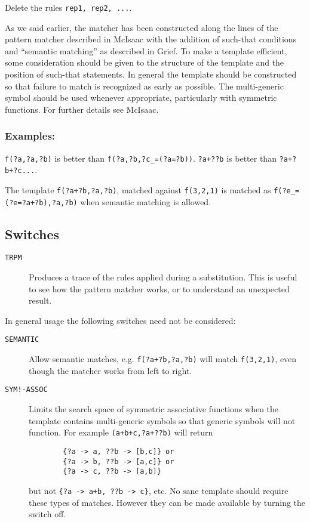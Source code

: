 Delete the rules \texttt{rep1, rep2, ...}.

As we said earlier, the matcher has been constructed along the lines of the
pattern matcher described in McIsaac with the addition of such-that conditions
and ``semantic matching'' as described in Grief.  To make a template efficient,
some consideration should be given to the structure of the template and the
position of such-that statements.  In general the template should be constructed
so that failure to match is recognized as early as possible.  The multi-generic
symbol should be used whenever appropriate, particularly with symmetric
functions.  For further details see McIsaac.

\subsubsection*{Examples:}

\texttt{f(?a,?a,?b)} is better than \texttt{f(?a,?b,?c\_=(?a=?b))}. 
\texttt{?a+??b} is better than \texttt{?a+?b+?c...}.

The template \texttt{f(?a+?b,?a,?b)}, matched against \texttt{f(3,2,1)} is
matched as \texttt{f(?e\_=(?e=?a+?b),?a,?b)} when semantic matching is allowed.


\subsection{Switches}

\begin{description}
  \item[\texttt{TRPM}] Produces a trace of the rules applied during a
    substitution.  This is useful to see how the pattern matcher works, or to
    understand an unexpected result.
\end{description}
In general usage the following switches need not be considered:
\begin{description}
  \item[\texttt{SEMANTIC}] Allow semantic matches, e.g. \texttt{f(?a+?b,?a,?b)}
    will match \texttt{f(3,2,1)}, even though the matcher works from left to
    right.
  \item[\texttt{SYM!-ASSOC}] Limits the search space of symmetric associative
    functions when the template contains multi-generic symbols so that generic
    symbols will not function. For example \texttt{(a+b+c,?a+??b)} will return
      \begin{verbatim}
        {?a -> a, ??b -> [b,c]} or
        {?a -> b, ??b -> [a,c]} or
        {?a -> c, ??b -> [a,b]}
      \end{verbatim}
    but not \texttt{\{?a -> a+b, ??b -> c\}}, etc.  No sane template should
    require these types of matches.  However they can be made available by
    turning the switch off.
\end{description}

